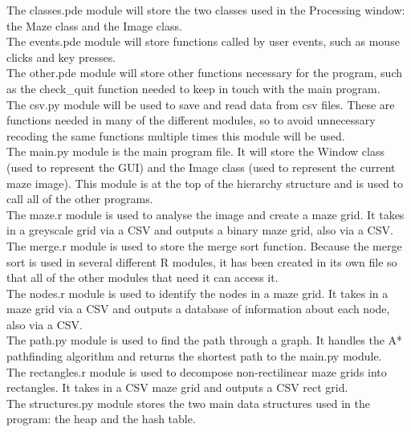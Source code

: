 \documentclass[titlepage]{article}
\begin{document}
The classes.pde module will store the two classes used in the Processing window: the Maze class and the Image class.\\

The events.pde module will store functions called by user events, such as mouse clicks and key presses.\\

The other.pde module will store other functions necessary for the program, such as the check\_quit function needed to keep in touch with the main program.\\

The csv.py module will be used to save and read data from csv files. These are functions needed in many of the different modules, so to avoid unnecessary recoding the same functions multiple times this module will be used.\\

The main.py module is the main program file. It will store the Window class (used to represent the GUI) and the Image class (used to represent the current maze image). This module is at the top of the hierarchy structure and is used to call all of the other programs.\\

The maze.r module is used to analyse the image and create a maze grid. It takes in a greyscale grid via a CSV and outputs a binary maze grid, also via a CSV.\\

The merge.r module is used to store the merge sort function. Because the merge sort is used in several different R modules, it has been created in its own file so that all of the other modules that need it can access it.\\

The nodes.r module is used to identify the nodes in a maze grid. It takes in a maze grid via a CSV and outputs a database of information about each node, also via a CSV.\\

The path.py module is used to find the path through a graph. It handles the A* pathfinding algorithm and returns the shortest path to the main.py module.\\

The rectangles.r module is used to decompose non-rectilinear maze grids into rectangles. It takes in a CSV maze grid and outputs a CSV rect grid.\\

The structures.py module stores the two main data structures used in the program: the heap and the hash table.\\
\end{document}
